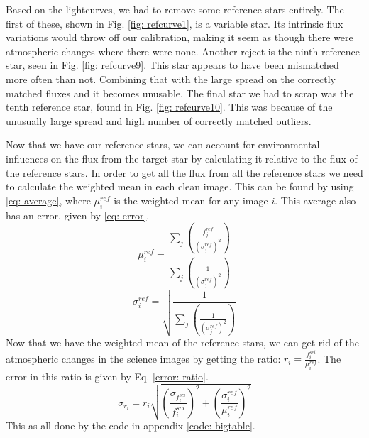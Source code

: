 \documentclass{aastex61}
\begin{document}
Based on the lightcurves, we had to remove some reference stars entirely. The first of these, shown in Fig. \ref{fig: refcurve1}, is a variable star. Its intrinsic flux variations would throw off our calibration, making it seem as though there were atmospheric changes where there were none. Another reject is the ninth reference star, seen in Fig. \ref{fig: refcurve9}. This star appears to have been mismatched more often than not. Combining that with the large spread on the correctly matched fluxes and it becomes unusable. The final star we had to scrap was the tenth reference star, found in Fig. \ref{fig: refcurve10}. This was because of the unusually large spread and high number of correctly matched outliers.

Now that we have our reference stars, we can account for environmental influences on the flux from the target star by calculating it relative to the flux of the reference stars. In order to get all the flux from all the reference stars we need to calculate the weighted mean in each clean image. This can be found by using \eqref{eq: average}, where $\mu_{i}^{ref}$ is the weighted mean for any image $i$. This average also has an error, given by \eqref{eq: error}. 
\begin{equation} \label{eq: average}
	\mu_{i}^{ref} = \frac{\sum_{j}\left( \frac{f_{j}^{ref}}{\left( \sigma_{j}^{ref}\right) ^{2}}\right) }{\sum_{j}\left( \frac{1}{\left( \sigma_{j}^{ref}\right) ^{2}}\right) }
\end{equation}
\begin{equation} \label{eq: error}
	\sigma_{i}^{ref} = \sqrt{\frac{1}{\sum_{j}\left( \frac{1}{\left( \sigma_{j}^{ref}\right) ^{2}}\right)}}
\end{equation}
Now that we have the weighted mean of the reference stars, we can get rid of the atmospheric changes in the science images by getting the ratio: $r_{i} = \frac{f_{i}^{sci}}{\mu_{i}^{ref}}$. The error in this ratio is given by Eq. \eqref{error: ratio}. 
\begin{equation}\label{error: ratio}
\sigma_{r_{i}} = r_{i} \sqrt{\left( \frac{\sigma_{f_{i}^{sci}}}{f_{i}^{sci}}\right) ^{2} + \left( \frac{\sigma_{i}^{ref}}{\mu_{i}^{ref}}\right) ^{2}}
\end{equation}
This as all done by the code in appendix \ref{code: bigtable}.
\end{document}
